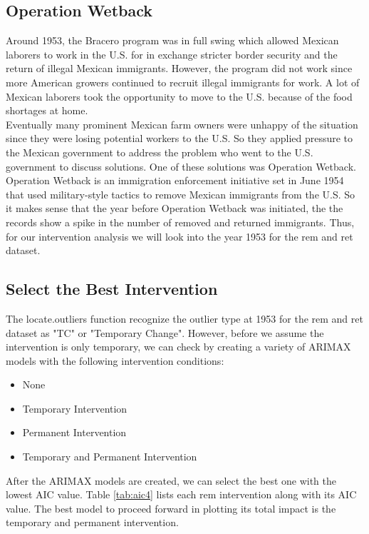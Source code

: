 \documentclass[a4paper]{article}
\begin{document}
\subsection{Operation Wetback}

Around 1953, the Bracero program was in full swing which allowed Mexican laborers to work in the U.S. for in exchange stricter border security and the return of illegal Mexican immigrants. However, the program did not work since more American growers continued to recruit illegal immigrants for work. A lot of Mexican laborers took the opportunity to move to the U.S. because of the food shortages at home. \\

Eventually many prominent Mexican farm owners were unhappy of the situation since they were losing potential workers to the U.S. So they applied pressure to the Mexican government to address the problem who went to the U.S. government to discuss solutions. One of these solutions was Operation Wetback. \\

Operation Wetback is an immigration enforcement initiative set in June 1954 that used military-style tactics to remove Mexican immigrants from the U.S. So it makes sense that the year before Operation Wetback was initiated, the the records show a spike in the number of removed and returned immigrants. Thus, for our intervention analysis we will look into the year 1953 for the rem and ret dataset.

\subsection{Select the Best Intervention}

The locate.outliers function recognize the outlier type at 1953 for the rem and ret dataset as "TC" or "Temporary Change". However, before we assume the intervention is only temporary, we can check by creating a variety of ARIMAX models with the following intervention conditions:

\begin{itemize}
    \item None
    \item Temporary Intervention
    \item Permanent Intervention
    \item Temporary and Permanent Intervention
\end{itemize}

After the ARIMAX models are created, we can select the best one with the lowest AIC value. Table \ref{tab:aic4} lists each rem intervention along with its AIC value. The best model to proceed forward in plotting its total impact is the temporary and permanent intervention.
\end{document}

